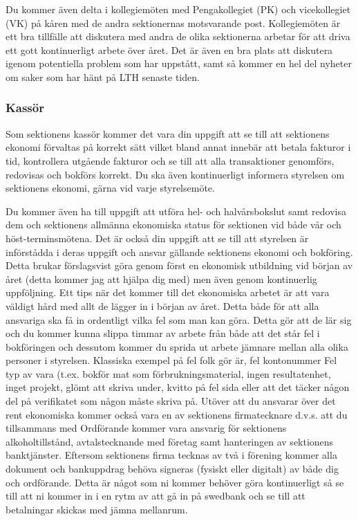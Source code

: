 \documentclass[10pt]{article}
\begin{document}
Du kommer även delta i kollegiemöten med Pengakollegiet (PK) och vicekollegiet (VK) på kåren med de andra sektionernas motsvarande post. Kollegiemöten är ett bra tillfälle att diskutera med andra de olika sektionerna arbetar för att driva ett gott kontinuerligt arbete över året. Det är även en bra plats att diskutera igenom potentiella problem som har uppstått, samt så kommer en hel del nyheter om saker som har hänt på LTH senaste tiden.

\subsubsection{Kassör}
Som sektionens kassör kommer det vara din uppgift att se till att sektionens ekonomi förvaltas på korrekt sätt vilket bland annat innebär att betala fakturor i tid, kontrollera utgående fakturor och se till att alla transaktioner genomförs, redovisas och bokförs korrekt. Du ska även kontinuerligt informera styrelsen om sektionens ekonomi, gärna vid varje styrelsemöte. \newline \newline

Du kommer även ha till uppgift att utföra hel- och halvårsbokslut samt redovisa dem och sektionens allmänna ekonomiska status för sektionen vid både vår och höst-terminsmötena. Det är också din uppgift att se till att styrelsen är införstådda i deras uppgift och ansvar gällande sektionens ekonomi och bokföring. Detta brukar förslagsvist göra genom först en ekonomisk utbildning vid början av året (detta kommer jag att hjälpa dig med) men även genom kontinuerlig uppföljning. \newline
Ett tips när det kommer till det ekonomiska arbetet är att vara väldigt hård med allt de lägger in i början av året. Detta både för att alla ansvariga ska få in ordentligt vilka fel som man kan göra. Detta gör att de lär sig och du kommer kunna slippa timmar av arbete från både att det står fel i bokföringen och dessutom kommer du sprida ut arbete jämnare mellan alla olika personer i styrelsen. Klassiska exempel på fel folk gör är, fel kontonummer Fel typ av vara (t.ex. bokför mat som förbrukningsmaterial, ingen resultatenhet, inget projekt, glömt att skriva under, kvitto på fel sida eller att det täcker någon del på verifikatet som någon måste skriva på.
\newline \newline
Utöver att du ansvarar över det rent ekonomiska kommer också vara en av sektionens firmatecknare d.v.s. att du tillsammans med Ordförande kommer vara ansvarig för sektionens alkoholtillstånd, avtalstecknande med företag samt hanteringen av sektionens banktjänster. Eftersom sektionens firma tecknas av två i förening kommer alla dokument och bankuppdrag behöva signeras (fysiskt eller digitalt) av både dig och ordförande. Detta är något som ni kommer behöver göra kontinuerligt så se till att ni kommer in i en rytm av att gå in på swedbank och se till att betalningar skickas med jämna mellanrum.
\end{document}
